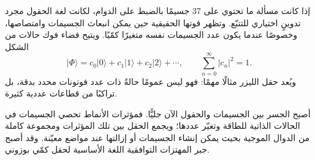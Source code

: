 إذا كانت مسألة ما تحتوي على 37 جسيمًا بالضبط على الدوام، لكانت لغة الحقول مجرد تدوينٍ اختياري للتتبّع. وتظهر قوتها الحقيقية حين يمكن انبعاث الجسيمات وامتصاصها، وخصوصًا عندما يكون عدد الجسيمات نفسه متغيرًا كمّيًا. ويتيح فضاء فوك حالات من الشكل
\begin{equation}
|\Phi\rangle
=c_0|0\rangle+c_1|1\rangle+c_2|2\rangle+\cdots,
\qquad
\sum_{n=0}^{\infty}|c_n|^2=1.
\end{equation}
ويُعد حقل الليزر مثالًا مهمًا: فهو ليس عمومًا حالةً ذات عدد فوتونات محدد بدقة، بل تراكبًا من قطاعات عددية كثيرة.

أصبح الجسر بين الجسيمات والحقول الآن جليًّا. فمؤثرات الأنماط تحصي الجسيمات في الحالات الذاتية للطاقة وتغيّر عددها؛ ويجمع الحقل بين تلك المؤثرات ومجموعة كاملة من الدوال الموجية بحيث يمكن إنشاء الجسيمات أو إزالتها عند مواضع معيّنة. وقد أصبح جبر المهتزات التوافقية اللغة الأساسية لحقل كمّي بوزوني.
